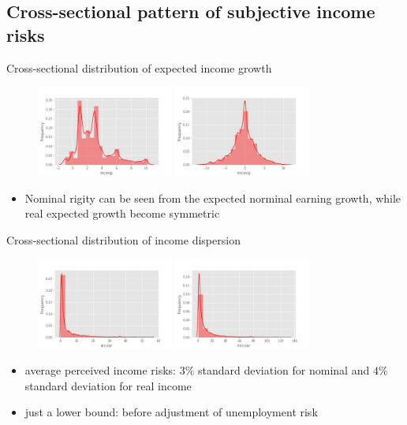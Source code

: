 \documentclass{beamer}
\begin{document}
\subsection{Cross-sectional pattern of subjective income risks}

\begin{frame}{Cross-sectional distribution of expected income growth}
	\begin{figure}
		\centering
		\label{incexp_hist}
		\includegraphics[width=0.4\textwidth]{figures/hist_incexp}
		\includegraphics[width=0.4\textwidth]{figures/hist_rincexp} 
	\end{figure}
	\begin{itemize}
		\item Nominal rigity can be seen from the expected norminal earning growth, while real expected growth become symmetric 
	\end{itemize}
\end{frame}

\begin{frame}{Cross-sectional distribution of income dispersion}
	\begin{figure}
		\centering
		\label{incvar_hist}
		\includegraphics[width=0.4\textwidth]{figures/hist_incvar}
		\includegraphics[width=0.4\textwidth]{figures/hist_rincvar}
	\end{figure}
	\begin{itemize}
		\item average perceived income risks:  $3\%$ standard deviation for nominal and $4\%$ standard deviation for real income
		\item just a lower bound: before adjustment of unemployment risk 
	\end{itemize}
\end{frame}
\end{document}
